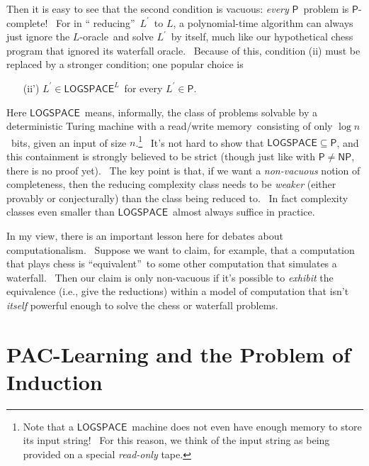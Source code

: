 \documentclass[12pt,onecolumn]{article}%
\begin{document}
Then it is easy to see that the second condition is vacuous: \textit{every}
$\mathsf{P}$\ problem is $\mathsf{P}$-complete! \ For in \textquotedblleft
reducing\textquotedblright\ $L^{\prime}$\ to $L$, a polynomial-time algorithm
can always just ignore the $L$-oracle\ and solve $L^{\prime}$\ by itself, much
like our hypothetical chess program that ignored its waterfall oracle.
\ Because of this, condition (ii) must be replaced by a stronger condition;
one popular choice is

\begin{enumerate}
\item[(ii')] $L^{\prime}\in\mathsf{LOGSPACE}^{L}$\ for every $L^{\prime}%
\in\mathsf{P}$.
\end{enumerate}

Here $\mathsf{LOGSPACE}$\ means, informally, the class of problems solvable by
a deterministic Turing machine with a read/write memory\ consisting of only
$\log n$\ bits, given an input of size $n$.\footnote{Note that a
$\mathsf{LOGSPACE}$\ machine does not even have enough memory to store its
input string! \ For this reason, we think of the input string as being
provided on a special \textit{read-only} tape.} \ It's not hard to show that
$\mathsf{LOGSPACE}\subseteq\mathsf{P}$, and this containment is strongly
believed to be strict (though just like with $\mathsf{P}\neq\mathsf{NP}$,
there is no proof yet). \ The key point is that, if we want a
\textit{non-vacuous} notion of completeness, then the reducing complexity
class needs to be \textit{weaker} (either provably or conjecturally) than the
class being reduced to. \ In fact complexity classes even smaller than
$\mathsf{LOGSPACE}$\ almost always suffice in practice.

In my view, there is an important lesson here for debates about
computationalism. \ Suppose we want to claim, for example, that a computation
that plays chess is \textquotedblleft equivalent\textquotedblright\ to some
other computation that simulates a waterfall. \ Then our claim is only
non-vacuous if it's possible to \textit{exhibit} the equivalence (i.e., give
the reductions) within a model of computation that isn't \textit{itself}
powerful enough to solve the chess or waterfall problems.

\section{PAC-Learning and the Problem of Induction\label{PAC}}
\end{document}
